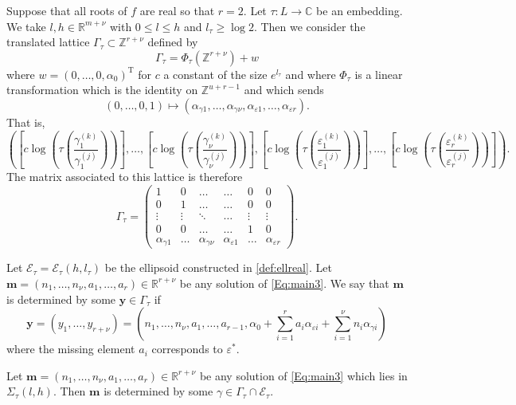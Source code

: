 Suppose that all roots of $f$ are real so that $r = 2$. Let $\tau:L\to\mathbb{C}$ be an embedding. We take $l,h \in \mathbb{R}^{m+\nu}$ with $0\leq l\leq h$ and $l_\tau\geq \log 2$. Then we consider the 
translated lattice $\Gamma_{\tau}\subset \mathbb{Z}^{r + \nu}$ defined by 
\[\Gamma_{\tau} =\Phi_{\tau}(\mathbb{Z}^{r+\nu})+w\]
where $w=(0,\dotsc,0,\alpha_0)^{\text{T}}$ for $c$ a constant of the size $e^{l_\tau}$ and where $\Phi_\tau$ is a linear transformation which is the identity on $\mathbb{Z}^{u+r - 1}$ and which sends 
\[(0, \dots, 0, 1) \mapsto (\alpha_{\gamma 1}, \dots, \alpha_{\gamma {\nu}}, \alpha_{\varepsilon 1}, \dots, \alpha_{\varepsilon {r}}).\]
That is, 
\[\left( \left[c\log\left(\tau\left(\frac{\gamma_1^{(k)}}{\gamma_1^{(j)}}\right)\right)\right], \dots, \left[c\log\left(\tau\left(\frac{\gamma_{\nu}^{(k)}}{\gamma_{\nu}^{(j)}}\right)\right)\right], \left[c\log\left(\tau\left(\frac{\varepsilon_1^{(k)}}{\varepsilon_1^{(j)}}\right)\right)\right], \dots, \left[c\log\left(\tau\left(\frac{\varepsilon_r^{(k)}}{\varepsilon_r^{(j)}}\right)\right)\right] \right).\]
The matrix associated to this lattice is therefore
\[\Gamma_{\tau} = \begin{pmatrix}
	1 & 0 & \dots &  \dots & 0 & 0\\ 
	0 & 1	& \dots & \dots & 0 & 0\\
	\vdots & \vdots & \ddots & \dots & \vdots & \vdots \\ 
	0 & 0 & \dots &  \dots & 1 & 0\\ 
	\alpha_{\gamma 1} & \dots &\alpha_{\gamma {\nu}} & \alpha_{\varepsilon 1} & \dots & \alpha_{\varepsilon {r}}
\end{pmatrix}.\]

Let $\mathcal E_{\tau}=\mathcal E_{\tau}(h,l_{\tau})$ be the ellipsoid constructed in \eqref{def:ellreal}. Let ${\mathbf{m} = (n_1, \dots, n_{\nu}, a_1, \dots, a_r) \in \mathbb{R}^{r + \nu}}$ be any solution of \eqref{Eq:main3}. We say that $\mathbf{m}$ is determined by some $\mathbf{y} \in \Gamma_{\tau}$ if 
\[\mathbf{y} = (y_1, \dots, y_{r+ \nu}) = \left(n_1, \dots, n_{\nu}, a_1, \dots, a_{r-1}, \alpha_0+\sum_{i = 1}^r a_i \alpha_{\varepsilon i} + \sum_{i = 1}^{\nu} n_i \alpha_{\gamma i}\right)\]
where the missing element $a_{i}$ corresponds to $\varepsilon^*$.

\begin{lemma}\label{lem:archsieve}
Let ${\mathbf{m} = (n_1, \dots, n_{\nu}, a_1, \dots, a_r) \in \mathbb{R}^{r + \nu}}$ be any solution of \eqref{Eq:main3} which lies in $\Sigma_\tau(l,h)$. Then $\mathbf{m}$ is determined by some $\gamma\in \Gamma_\tau\cap\mathcal E_\tau.$
\end{lemma}


